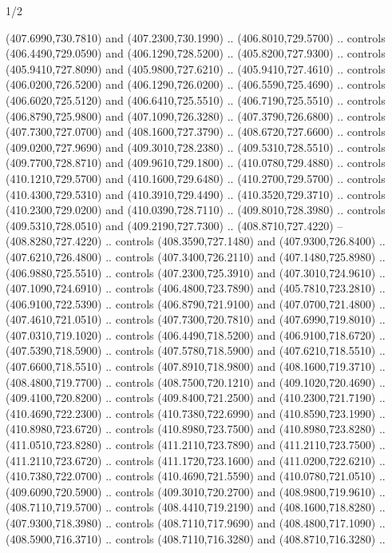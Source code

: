\begin{flagdescription}{1/2}
\begin{scope}[xshift=0.5\flaglength]
\begin{scope}[scale=0.00745\flagwidth,xshift=-12.1mm,yshift=41.7mm]
\begin{scope}[y=0.80pt, x=0.80pt, yscale=-1, xscale=1, inner sep=0pt, outer sep=0pt]
\begin{scope}[cm={{1.33333,0.0,0.0,-1.33333,(0.0,114.66667)}}]
\begin{scope}[scale=0.100]
  (407.6990,730.7810) and (407.2300,730.1990) .. (406.8010,729.5700) .. controls
  (406.4490,729.0590) and (406.1290,728.5200) .. (405.8200,727.9300) .. controls
  (405.9410,727.8090) and (405.9800,727.6210) .. (405.9410,727.4610) .. controls
  (406.0200,726.5200) and (406.1290,726.0200) .. (406.5590,725.4690) .. controls
  (406.6020,725.5120) and (406.6410,725.5510) .. (406.7190,725.5510) .. controls
  (406.8790,725.9800) and (407.1090,726.3280) .. (407.3790,726.6800) .. controls
  (407.7300,727.0700) and (408.1600,727.3790) .. (408.6720,727.6600) .. controls
  (409.0200,727.9690) and (409.3010,728.2380) .. (409.5310,728.5510) .. controls
  (409.7700,728.8710) and (409.9610,729.1800) .. (410.0780,729.4880) .. controls
  (410.1210,729.5700) and (410.1600,729.6480) .. (410.2700,729.5700) .. controls
  (410.4300,729.5310) and (410.3910,729.4490) .. (410.3520,729.3710) .. controls
  (410.2300,729.0200) and (410.0390,728.7110) .. (409.8010,728.3980) .. controls
  (409.5310,728.0510) and (409.2190,727.7300) .. (408.8710,727.4220) --
  (408.8280,727.4220) .. controls (408.3590,727.1480) and (407.9300,726.8400) ..
  (407.6210,726.4800) .. controls (407.3400,726.2110) and (407.1480,725.8980) ..
  (406.9880,725.5510) .. controls (407.2300,725.3910) and (407.3010,724.9610) ..
  (407.1090,724.6910) .. controls (406.4800,723.7890) and (405.7810,723.2810) ..
  (406.9100,722.5390) .. controls (406.8790,721.9100) and (407.0700,721.4800) ..
  (407.4610,721.0510) .. controls (407.7300,720.7810) and (407.6990,719.8010) ..
  (407.0310,719.1020) .. controls (406.4490,718.5200) and (406.9100,718.6720) ..
  (407.5390,718.5900) .. controls (407.5780,718.5900) and (407.6210,718.5510) ..
  (407.6600,718.5510) .. controls (407.8910,718.9800) and (408.1600,719.3710) ..
  (408.4800,719.7700) .. controls (408.7500,720.1210) and (409.1020,720.4690) ..
  (409.4100,720.8200) .. controls (409.8400,721.2500) and (410.2300,721.7190) ..
  (410.4690,722.2300) .. controls (410.7380,722.6990) and (410.8590,723.1990) ..
  (410.8980,723.6720) .. controls (410.8980,723.7500) and (410.8980,723.8280) ..
  (411.0510,723.8280) .. controls (411.2110,723.7890) and (411.2110,723.7500) ..
  (411.2110,723.6720) .. controls (411.1720,723.1600) and (411.0200,722.6210) ..
  (410.7380,722.0700) .. controls (410.4690,721.5590) and (410.0780,721.0510) ..
  (409.6090,720.5900) .. controls (409.3010,720.2700) and (408.9800,719.9610) ..
  (408.7110,719.5700) .. controls (408.4410,719.2190) and (408.1600,718.8280) ..
  (407.9300,718.3980) .. controls (408.7110,717.9690) and (408.4800,717.1090) ..
  (408.5900,716.3710) .. controls (408.7110,716.3280) and (408.8710,716.3280) ..

\end{scope}
\end{scope}
\end{scope}
\end{scope}
\end{scope}
\end{flagdescription}
